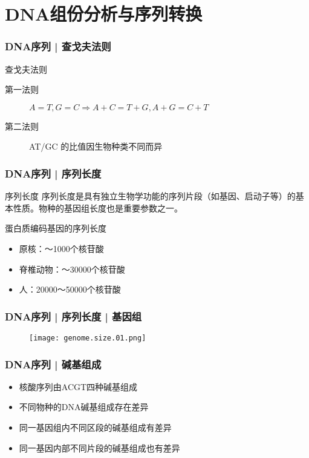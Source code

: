 \section{DNA组份分析与序列转换}
\begin{frame}
  \frametitle{DNA序列 | 查戈夫法则}
  \begin{block}{查戈夫法则}
    \begin{description}
      \item[第一法则]$A=T, G=C \Longrightarrow A+C=T+G, A+G=C+T$
      \item[第二法则]AT/GC 的比值因生物种类不同而异
    \end{description}
  \end{block}
\end{frame}

\begin{frame}
  \frametitle{DNA序列 | 序列长度}
  \begin{block}{序列长度}
    序列长度是具有独立生物学功能的序列片段（如基因、启动子等）的基本性质。物种的基因组长度也是重要参数之一。 
  \end{block}
  \pause
  \begin{block}{蛋白质编码基因的序列长度}
    \begin{itemize}
      \item 原核：～1000个核苷酸
      \item 脊椎动物：～30000个核苷酸
      \item 人：20000～50000个核苷酸
    \end{itemize}
  \end{block}
\end{frame}

\begin{frame}
  \frametitle{DNA序列 | 序列长度 | 基因组}
  \begin{figure}
    \centering
    \texttt{[image: genome.size.01.png]}
  \end{figure}
\end{frame}

\begin{frame}
  \frametitle{DNA序列 | 碱基组成}
  \begin{itemize}
    \item 核酸序列由ACGT四种碱基组成
    \item 不同物种的DNA碱基组成存在差异
    \item 同一基因组内不同区段的碱基组成有差异
    \item 同一基因内部不同片段的碱基组成也有差异
  \end{itemize}
\end{frame}

